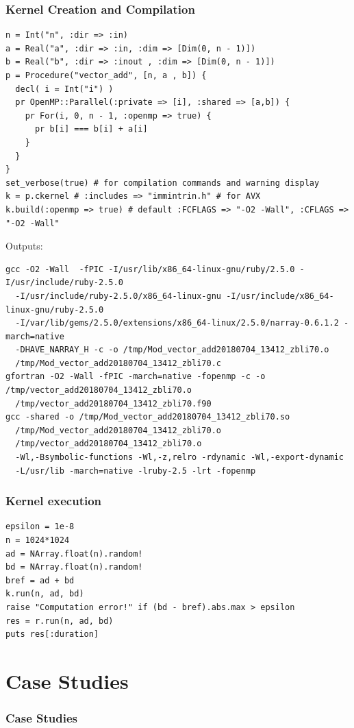 \documentclass{beamer}
\begin{document}
\begin{frame}[fragile]
\frametitle{Kernel Creation and Compilation}
\lstset{style=BOAST}
\begin{lstlisting}
n = Int("n", :dir => :in)
a = Real("a", :dir => :in, :dim => [Dim(0, n - 1)])
b = Real("b", :dir => :inout , :dim => [Dim(0, n - 1)])
p = Procedure("vector_add", [n, a , b]) {
  decl( i = Int("i") )
  pr OpenMP::Parallel(:private => [i], :shared => [a,b]) {
    pr For(i, 0, n - 1, :openmp => true) {
      pr b[i] === b[i] + a[i]
    }
  }
}
set_verbose(true) # for compilation commands and warning display
k = p.ckernel # :includes => "immintrin.h" # for AVX
k.build(:openmp => true) # default :FCFLAGS => "-O2 -Wall", :CFLAGS => "-O2 -Wall"
\end{lstlisting}
Outputs:
\lstset{language=BASH}
\begin{lstlisting}
gcc -O2 -Wall  -fPIC -I/usr/lib/x86_64-linux-gnu/ruby/2.5.0 -I/usr/include/ruby-2.5.0
  -I/usr/include/ruby-2.5.0/x86_64-linux-gnu -I/usr/include/x86_64-linux-gnu/ruby-2.5.0
  -I/var/lib/gems/2.5.0/extensions/x86_64-linux/2.5.0/narray-0.6.1.2 -march=native
  -DHAVE_NARRAY_H -c -o /tmp/Mod_vector_add20180704_13412_zbli70.o
  /tmp/Mod_vector_add20180704_13412_zbli70.c
gfortran -O2 -Wall -fPIC -march=native -fopenmp -c -o /tmp/vector_add20180704_13412_zbli70.o
  /tmp/vector_add20180704_13412_zbli70.f90
gcc -shared -o /tmp/Mod_vector_add20180704_13412_zbli70.so
  /tmp/Mod_vector_add20180704_13412_zbli70.o
  /tmp/vector_add20180704_13412_zbli70.o
  -Wl,-Bsymbolic-functions -Wl,-z,relro -rdynamic -Wl,-export-dynamic
  -L/usr/lib -march=native -lruby-2.5 -lrt -fopenmp
\end{lstlisting}
\end{frame}

\begin{frame}[fragile]
\frametitle{Kernel execution}
\lstset{style=BOAST}
\begin{lstlisting}
epsilon = 1e-8
n = 1024*1024
ad = NArray.float(n).random!
bd = NArray.float(n).random!
bref = ad + bd
k.run(n, ad, bd)
raise "Computation error!" if (bd - bref).abs.max > epsilon
res = r.run(n, ad, bd)
puts res[:duration]
\end{lstlisting}
\end{frame}

\section{Case Studies}

\begin{frame}
\frametitle{Case Studies}
\end{frame}
\end{document}
